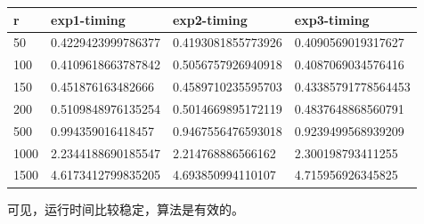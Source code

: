 \documentclass[12pt,letterpaper]{article}
\begin{document}
\begin{table}[h]
\centering
\begin{tabular}{|l|l|l|l|}
\hline
r & exp1-timing & exp2-timing & exp3-timing \\ \hline
  50  & 0.4229423999786377 &0.4193081855773926& 0.4090569019317627 \\ \hline
 100  & 0.4109618663787842&0.5056757926940918& 0.4087069034576416\\ \hline
 150  & 0.451876163482666&0.4589710235595703& 0.43385791778564453\\ \hline
 200  & 0.5109848976135254&0.5014669895172119& 0.4837648868560791\\ \hline
 500  & 0.994359016418457&0.9467556476593018& 0.9239499568939209\\ \hline
 1000  & 2.2344188690185547&2.214768886566162& 2.300198793411255\\ \hline
 1500  & 4.6173412799835205& 4.693850994110107& 4.715956926345825\\ \hline
\end{tabular}
\end{table}

可见，运行时间比较稳定，算法是有效的。
\end{document}
